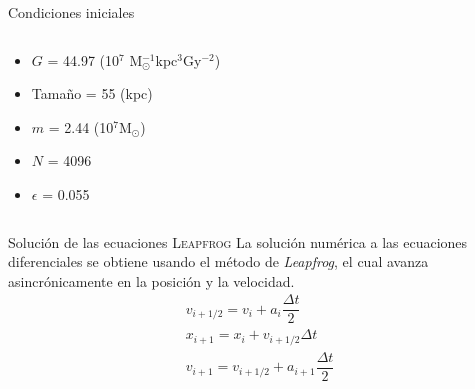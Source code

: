 \documentclass[handout]{beamer}
\begin{document}
\begin{frame}{Condiciones iniciales}
\begin{columns}
\begin{column}{0.65\textwidth}
			\footnotesize
			\begin{itemize}
				\item $G$ = 44.97 (10$^7$ M$_{\odot}^{-1}$kpc$^3$Gy$^{-2}$)
				\item Tama\~no = 55 (kpc)
				\item $m$ = 2.44 (10$^7$M$_{\odot}$)
				\item $N$ = 4096
				\item $\epsilon$ = 0.055
			\end{itemize}
		\end{column}
	\end{columns}
\end{frame}
\begin{frame}{Soluci\'on de las ecuaciones}
	{\scshape Leapfrog}
	La soluci\'on num\'erica a las ecuaciones diferenciales se obtiene usando el m\'etodo de \textit{Leapfrog}, el cual avanza asincr\'onicamente en la posici\'on y la velocidad.
	\begin{equation}
		\begin{matrix}
			v_{i+1/2} = v_i + a_i\dfrac{\Delta t}{2}\\
			x_{i+1} = x_i + v_{i+1/2}\Delta t \\
			v_{i+1} = v_{i+1/2}+a_{i+1}\dfrac{\Delta t}{2}
		\end{matrix}
	\end{equation}
\end{frame}
\end{document}

